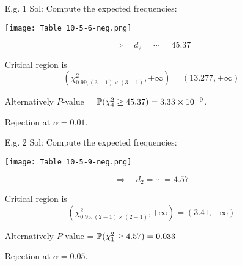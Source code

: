 \begin{frame}[2-]

	\begin{enumerate}
		\item[E.g. 1] Sol: Compute the expected frequencies:\\[1em]
			\begin{center}
				\texttt{[image: Table\_10-5-6-neg.png]}
			\end{center}
			\pause
		\item[]
			\[
			\Longrightarrow \quad d_2 = \cdots = 45.37
			\]
			\vfill
		\item[] Critical region is
			\[
				\left(\chi^2_{0.99,(3-1)\times (3-1)},+\infty \right) = (13.277,+\infty)
			\]
		\item[] Alternatively $P$-value = $\mathbb{P}(\chi^2_4 \ge 45.37)=   3.33\times 10^{-9}$.
			\vfill
		\item[] Rejection at $\alpha=0.01$.\myEnd
	\end{enumerate}
\end{frame}
\begin{frame}[2-]

	\begin{enumerate}
		\item[E.g. 2] Sol: Compute the expected frequencies:\\[1em]
			\begin{center}
				\texttt{[image: Table\_10-5-9-neg.png]}
			\end{center}
			\pause
		\item[]
			\[
			\Longrightarrow \quad d_2 = \cdots = 4.57
			\]
			\vfill
		\item[] Critical region is
			\[
				\left(\chi^2_{0.95,(2-1)\times (2-1)},+\infty \right) = (3.41,+\infty)
			\]
		\item[] Alternatively $P$-value = $\mathbb{P}(\chi^2_1\ge 4.57)=  0.033$
			\vfill
		\item[] Rejection at $\alpha=0.05$.\myEnd
	\end{enumerate}
\end{frame}
